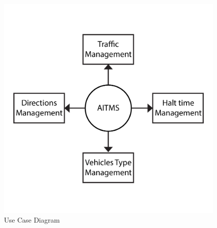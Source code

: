 \documentclass[openany,12pt]{report}
\begin{document}
	\begin{figure}[H]
		\centering
		\includegraphics[width=7.5 in]{./Diagrams/PNG/uml2}
		\caption{Use Case Diagram}
	\end{figure}
	

	\newpage
\end{document}
